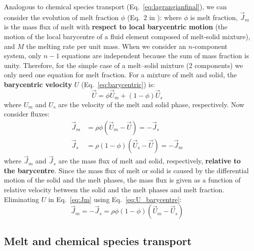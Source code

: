 \noindent
Analogous to chemical species transport (Eq.~\ref{eq:lagrangianfinal}), we can consider the evolution of melt fraction $\phi$ (Eq.~2 in \cite{ABE95}):
where $\phi$ is melt fraction, $\vec{J}_m$ is the mass flux of melt with \textbf{respect to local barycentric motion} (the motion of the local barycentre of a fluid element composed of melt-solid mixture), and $M$ the melting rate per unit mass.  When we consider an $n$-component system, only $n-1$ equations are independent because the sum of mass fraction is unity.  Therefore, for the simple case of a melt--solid mixture (2 components) we only need one equation for melt fraction.   For a mixture of melt and solid, the \textbf{barycentric velocity} $U$ (Eq.~\ref{eq:barycentric}) is:
\begin{equation}
\vec{U} = \phi \vec{U}_m + (1-\phi) \vec{U}_s
\label{eq:U_barycentre}
\end{equation}
where $U_m$ and $U_s$ are the velocity of the melt and solid phase, respectively.  Now consider fluxes:
\begin{align}
\vec{J}_m &= \rho \phi (\vec{U}_m - \vec{U}) = -\vec{J}_s \label{eq:Jm}\\
\vec{J}_s &= \rho (1-\phi) (\vec{U}_s - \vec{U}) = -\vec{J}_m \label{eq:Js}
\end{align}
where $\vec{J}_m$ and $\vec{J}_s$ are the mass flux of melt and solid, respectively, \textbf{relative to the barycentre}.  Since the mass flux of melt or solid is caused by the differential motion of the solid and the melt phases, the mass flux is given as a function of relative velocity between the solid and the melt phases and melt fraction.  Eliminating $U$ in Eq.~\ref{eq:Jm} using Eq.~\ref{eq:U_barycentre}:
\begin{equation}
\vec{J}_m=-\vec{J}_s=\rho \phi (1-\phi) (\vec{U}_m-\vec{U}_s)
\end{equation}
\subsection{Melt and chemical species transport}
\\

